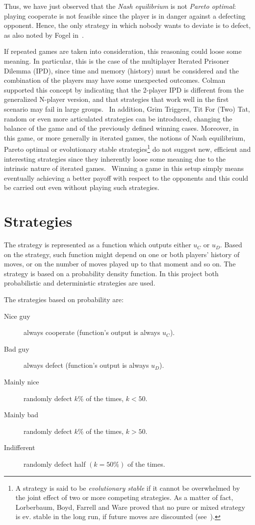 \documentclass[journal,10pt,twoside]{IEEEtran}
\begin{document}
Thus, we have just observed that the \textit{Nash equilibrium} is not \textit{Pareto optimal}: playing cooperate is not feasible since the player is in danger against a defecting opponent. Hence, the only strategy in which nobody wants to deviate is to defect, as also noted by Fogel in~\cite{fogelEvolvingBehaviors}.

If repeated games are taken into consideration, this reasoning could loose some meaning. In particular, this is the case of the multiplayer Iterated Prisoner Dilemma (IPD), since time and memory (history) must be considered and the combination of the players may have some unexpected outcomes.
Colman supported this concept by indicating that the 2-player IPD is different from the generalized N-player version, and that strategies that work well in the first scenario may fail in large groups.~\cite{yao1994experimental}
In addition, Grim Triggers, Tit For (Two) Tat, random or even more articulated strategies can be introduced, changing the balance of the game and of the previously defined winning cases.
Moreover, in this game, or more generally in iterated games, the notions of Nash equilibrium, Pareto optimal or evolutionary stable strategies\footnote{A strategy is said to be \textit{evolutionary stable} if it cannot be overwhelmed by the joint effect of two or more competing strategies. As a matter of fact, Lorberbaum, Boyd, Farrell and Ware proved that no pure or mixed strategy is ev. stable in the long run, if future moves are discounted (see~\cite{lorb94}).} do not suggest new, efficient and interesting strategies since they inherently loose some meaning due to the intrinsic nature of iterated games.~\cite{mathieu2017}
Winning a game in this setup simply means eventually achieving a better payoff with respect to the opponents and this could be carried out even without playing such strategies.

\section{Strategies} \label{s:str}
The strategy is represented as a function which outputs either $u_C$ or $u_D$. Based on the strategy, such function might depend on one or both players' history of moves, or on the number of moves played up to that moment and so on.
The strategy is based on a probability density function. In this project both probabilistic and deterministic strategies are used.

The strategies based on probability are:
\begin{description}
    \item[Nice guy] always cooperate (function's output is always $u_C$).
    \item[Bad guy] always defect (function's output is always $u_D$).
    \item[Mainly nice] randomly defect $k\%$ of the times, $k<50$.
    \item[Mainly bad] randomly defect $k\%$ of the times, $k>50$.
    \item[Indifferent] randomly defect half $(k=50\%)$ of the times.
\end{description}
\end{document}
